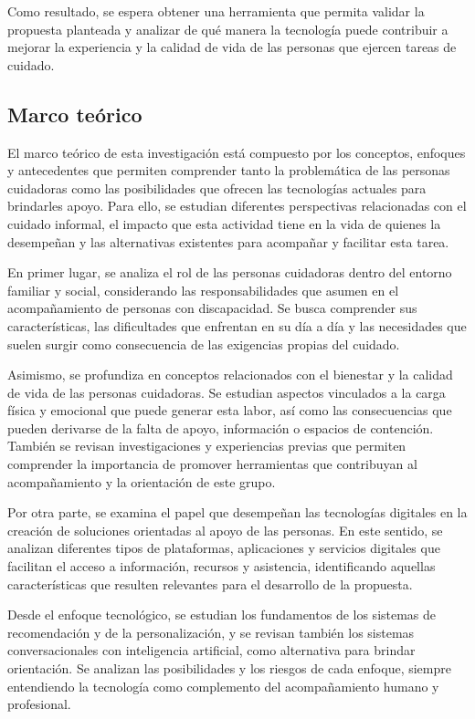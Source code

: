 Como resultado, se espera obtener una herramienta que permita validar la propuesta planteada y analizar de qué manera la tecnología puede contribuir a mejorar la experiencia y la calidad de vida de las personas que ejercen tareas de cuidado.

\subsection{Marco teórico}

El marco teórico de esta investigación está compuesto por los conceptos, enfoques y antecedentes que permiten comprender tanto la problemática de las personas cuidadoras como las posibilidades que ofrecen las tecnologías actuales para brindarles apoyo. Para ello, se estudian diferentes perspectivas relacionadas con el cuidado informal, el impacto que esta actividad tiene en la vida de quienes la desempeñan y las alternativas existentes para acompañar y facilitar esta tarea.

En primer lugar, se analiza el rol de las personas cuidadoras dentro del entorno familiar y social, considerando las responsabilidades que asumen en el acompañamiento de personas con discapacidad. Se busca comprender sus características, las dificultades que enfrentan en su día a día y las necesidades que suelen surgir como consecuencia de las exigencias propias del cuidado.

Asimismo, se profundiza en conceptos relacionados con el bienestar y la calidad de vida de las personas cuidadoras. Se estudian aspectos vinculados a la carga física y emocional que puede generar esta labor, así como las consecuencias que pueden derivarse de la falta de apoyo, información o espacios de contención. También se revisan investigaciones y experiencias previas que permiten comprender la importancia de promover herramientas que contribuyan al acompañamiento y la orientación de este grupo.

Por otra parte, se examina el papel que desempeñan las tecnologías digitales en la creación de soluciones orientadas al apoyo de las personas. En este sentido, se analizan diferentes tipos de plataformas, aplicaciones y servicios digitales que facilitan el acceso a información, recursos y asistencia, identificando aquellas características que resulten relevantes para el desarrollo de la propuesta.

Desde el enfoque tecnológico, se estudian los fundamentos de los sistemas de recomendación y de la personalización, y se revisan también los sistemas conversacionales con inteligencia artificial, como alternativa para brindar orientación. Se analizan las posibilidades y los riesgos de cada enfoque, siempre entendiendo la tecnología como complemento del acompañamiento humano y profesional.

